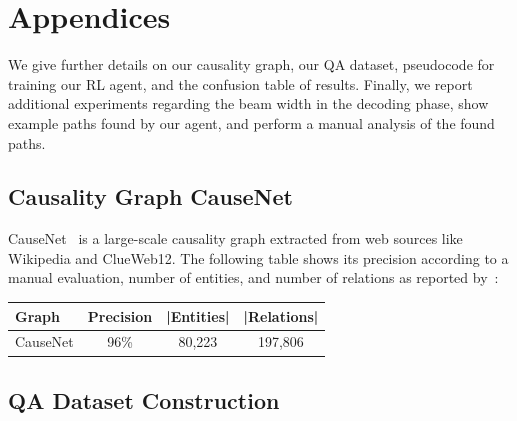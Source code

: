 \clearpage

\section{Appendices}

We give further details on our causality graph, our QA dataset, pseudocode for training our RL agent, and the confusion table of results. Finally, we report additional experiments regarding the beam width in the decoding phase, show example paths found by our agent, and perform a manual analysis of the found paths.

\subsection{Causality Graph CauseNet}
\label{sec:causenet}

CauseNet~\cite{Heindorf2020Causenet} is a large-scale causality graph extracted from web sources like Wikipedia and ClueWeb12. The following table shows its precision according to a manual evaluation, number of entities, and number of relations as reported by~\citet{Heindorf2020Causenet}:
\begin{table}[h]
\setlength{\tabcolsep}{6pt}
\begin{tabular}{@{}lccc@{}} 
  \toprule
  \textbf{Graph} & \textbf{Precision} & \textbf{|Entities|} & \textbf{|Relations|}\\
  \toprule
  CauseNet & 96\% & 80,223 & 197,806\\
  \bottomrule
\end{tabular}
\end{table}


\newcommand{\pattern}[1]{\texttt{\fontsize{9.5pt}{10pt}\selectfont [#1]}\xspace}

\subsection{QA Dataset Construction}
\label{sec:dataset}

